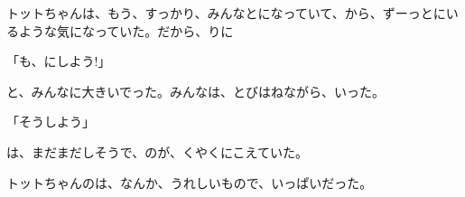 トットちゃんは、もう、すっかり、みんなとになっていて、から、ずーっとにいるような気になっていた。だから、りに

「も、にしよう!」

と、みんなに大きいでった。みんなは、とびはねながら、いった。

「そうしよう」

は、まだまだしそうで、のが、くやくにこえていた。

トットちゃんのは、なんか、うれしいもので、いっぱいだった。


